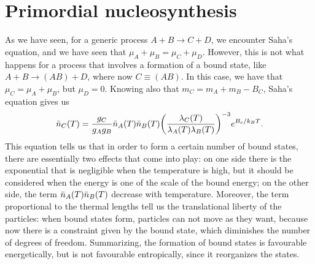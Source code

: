 \section{Primordial nucleosynthesis}
As we have seen, for a generic process $A + B \to C + D$, we encounter Saha's equation, and we have seen that $\mu_A + \mu_B = \mu_C + \mu_D$. However, this is not what happens for a process that involves a formation of a bound state, like $A + B \to (AB) + D$, where now $C \equiv (AB)$. In this case, we have that $\mu_C = \mu_A + \mu_B$, but $\mu_D = 0$. Knowing also that $m_C = m_A + m_B - B_C$, Saha's equation gives us 
\begin{equation}
    \bar{n}_C(T) = \frac{g_C}{g_Ag_B}\bar{n}_A(T)\bar{n}_B(T)\bigg(\frac{\lambda_C(T)}{\lambda_A(T)\lambda_B(T)}\bigg)^{-3}e^{B_c/k_BT}.
\end{equation}
This equation tells us that in order to form a certain number of bound states, there are essentially two effects that come into play: on one side there is the exponential that is negligible when the temperature is high, but it should be considered when the energy is one of the scale of the bound energy; on the other side, the term $\bar{n}_A(T)\bar{n}_B(T)$ decrease with temperature. Moreover, the term proportional to the thermal lengths tell us the translational liberty of the particles: when bound states form, particles can not move as they want, because now there is a constraint given by the bound state, which diminishes the number of degrees of freedom. Summarizing, the formation of bound states is favourable energetically, but is not favourable entropically, since it reorganizes the states. 

